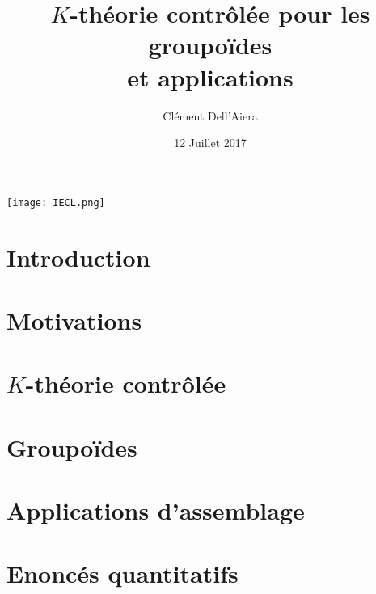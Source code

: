 \documentclass{beamer}
\title[First Steps with SCRATCH]{$K$-théorie contrôlée pour les groupoïdes\\ et applications}
\author{Clément Dell'Aiera}
\institute{IECL}
\date{12 Juillet 2017}
\begin{document}
\begin{frame}
  \titlepage
\begin{center}\texttt{[image: IECL.png]}\end{center}
\end{frame}

\begin{frame}
  \tableofcontents
\end{frame}

\section{Introduction}


\section{Motivations}
\begin{frame}
  \tableofcontents[currentsection]
\end{frame}


\section{$K$-théorie contrôlée}
\begin{frame}
  \tableofcontents[currentsection]
\end{frame}


%

\section{Groupoïdes}
\begin{frame}
  \tableofcontents[currentsection]
\end{frame}



\section{Applications d'assemblage}
\begin{frame}
  \tableofcontents[currentsection]
\end{frame}


\section{Enoncés quantitatifs}
\begin{frame}
  \tableofcontents[currentsection]
\end{frame}

\end{document}
